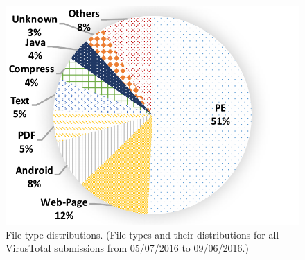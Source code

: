 \begin{figure}[t!]
\begin{center}
\includegraphics[width=2.in]{figure/type}
\caption{File type distributions.
(File types and their distributions for all VirusTotal submissions from 05/07/2016 to 09/06/2016.)
}
\label{fig:type}
\end{center}
\end{figure}
